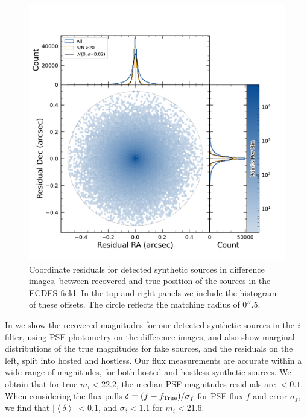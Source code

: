 \begin{figure}[htb!]
\centering
\includegraphics[trim={0 0 0 0},width=\linewidth]{figures/coordinate_offsets_hexbin.pdf}
\caption{Coordinate residuals for detected synthetic sources in difference images, between recovered and true position of the sources in the ECDFS field. In the top and right panels we include the histogram of these offsets. The circle reflects the matching radius of $0''.5$.}
\label{fig:coordinate_offset_diffim_fakes}
\end{figure}
%
In  we show the recovered magnitudes for our detected synthetic sources in the \textit{i} filter, using PSF photometry on the difference images, and also show marginal distributions of the true magnitudes for fake sources, and the residuals on the left, split into hosted and hostless. 
%
Our flux measurements are accurate within a wide range of magnitudes, for both hosted and hostless synthetic sources. We obtain that for true $m_i < 22.2$, the median PSF magnitudes residuals are $<0.1$. When considering the flux pulls $\delta = (f-f_{\rm{True}})/\sigma_f$ for PSF flux $f$ and error $\sigma_f$, we find that $|\left<\delta\right>| <0.1$, and $\sigma_\delta < 1.1$ for $m_i<21.6$.
%

